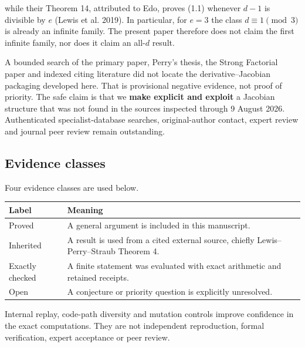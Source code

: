 \documentclass[
]{article}
\newcounter{none} %
\begin{document}
while their Theorem 14, attributed to Edo, proves (1.1) whenever \(d-1\)
is divisible by \(e\) (Lewis et al. 2019). In particular, for \(e=3\)
the class \(d\equiv1\pmod3\) is already an infinite family. The present
paper therefore does not claim the first infinite family, nor does it
claim an all-\(d\) result.

A bounded search of the primary paper, Perry's thesis, the Strong
Factorial paper and indexed citing literature did not locate the
derivative--Jacobian packaging developed here. That is provisional
negative evidence, not proof of priority. The safe claim is that we
\textbf{make explicit and exploit} a Jacobian structure that was not
found in the sources inspected through 9 August 2026. Authenticated
specialist-database searches, original-author contact, expert review and
journal peer review remain outstanding.

\subsection{Evidence classes}\label{evidence-classes}

Four evidence classes are used below.

{\def\LTcaptype{none} %
\begin{longtable}[]{@{}
  >{\raggedright\arraybackslash}p{}
  >{\raggedright\arraybackslash}p{}@{}}
\toprule\noalign{}
\begin{minipage}[b]{\linewidth}\raggedright
Label
\end{minipage} & \begin{minipage}[b]{\linewidth}\raggedright
Meaning
\end{minipage} \\
\midrule\noalign{}
\endhead
\bottomrule\noalign{}
\endlastfoot
Proved & A general argument is included in this manuscript. \\
Inherited & A result is used from a cited external source, chiefly
Lewis--Perry--Straub Theorem 4. \\
Exactly checked & A finite statement was evaluated with exact arithmetic
and retained receipts. \\
Open & A conjecture or priority question is explicitly unresolved. \\
\end{longtable}
}

Internal replay, code-path diversity and mutation controls improve
confidence in the exact computations. They are not independent
reproduction, formal verification, expert acceptance or peer review.
\end{document}
